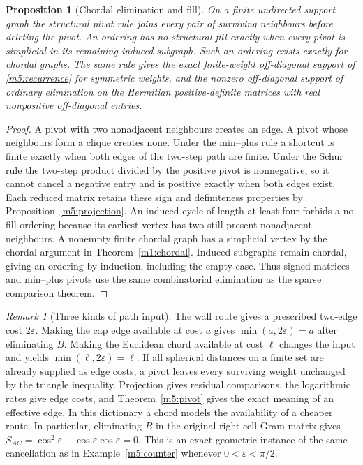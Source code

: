 \documentclass[11pt,reqno]{amsart}
\newtheorem{proposition}[theorem]{Proposition}
\theoremstyle{definition}
\theoremstyle{remark}
\newtheorem{remark}[theorem]{Remark}
\numberwithin{equation}{section}
\begin{document}
\begin{proposition}[Chordal elimination and fill]\label{m5:fill}
On a finite undirected support graph the structural pivot rule joins every
pair of surviving neighbours before deleting the pivot. An ordering
has no structural fill exactly when every pivot is simplicial in its
remaining induced subgraph. Such an ordering exists exactly for chordal
graphs. The same rule gives the exact finite-weight off-diagonal support
of \eqref{m5:recurrence} for symmetric weights, and the nonzero
off-diagonal support of ordinary elimination on the Hermitian
positive-definite matrices with real nonpositive off-diagonal entries.
\end{proposition}
\begin{proof}
A pivot with two nonadjacent neighbours creates an edge. A pivot whose
neighbours form a clique creates none. Under the min--plus rule a
shortcut is finite exactly when both edges of the two-step path are
finite. Under the Schur rule the two-step product divided by the positive
pivot is nonnegative, so it cannot cancel a negative entry and is
positive exactly when both edges exist. Each reduced matrix retains
these sign and definiteness properties by Proposition~\ref{m5:projection}.
An induced cycle of length at least four forbids a no-fill ordering
because its earliest vertex has two still-present nonadjacent
neighbours. A nonempty finite chordal graph has a simplicial vertex
by the chordal argument in Theorem~\ref{m1:chordal}. Induced subgraphs
remain chordal, giving an ordering by induction, including the empty
case. Thus signed matrices and min--plus pivots use the same
combinatorial elimination as the sparse comparison theorem.
\end{proof}

\begin{remark}[Three kinds of path input]\label{m5:dictionary}
The wall route gives a prescribed two-edge cost \(2\varepsilon\).
Making the cap edge available at cost \(a\) gives
\(\min(a,2\varepsilon)=a\) after eliminating \(B\).
Making the Euclidean chord available at cost \(\ell\) changes the
input and yields \(\min(\ell,2\varepsilon)=\ell\).
If all spherical distances on a finite set are already supplied as
edge costs, a pivot leaves every surviving weight unchanged by the
triangle inequality.
Projection gives residual comparisons, the logarithmic rates give
edge costs, and Theorem~\ref{m5:pivot} gives the exact meaning of
an effective edge. In this dictionary a chord models the availability
of a cheaper route. In particular, eliminating \(B\) in the original
right-cell Gram matrix gives \(S_{AC}=\cos^2\varepsilon-
\cos\varepsilon\cos\varepsilon=0\). This is an exact geometric instance
of the same cancellation as in Example~\ref{m5:counter} whenever
\(0<\varepsilon<\pi/2\).
\end{remark}
\end{document}
